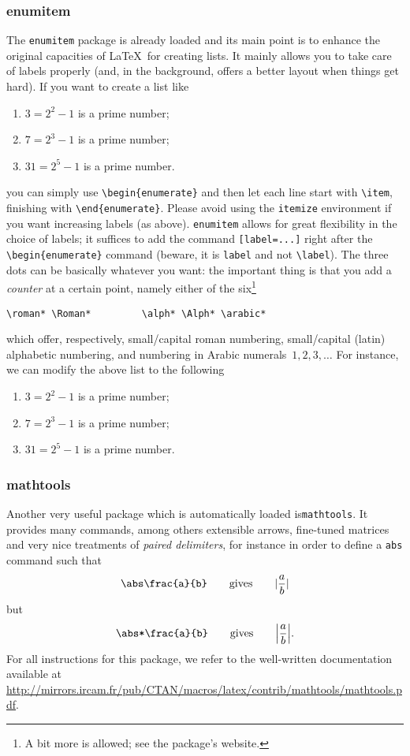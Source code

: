 \documentclass[IGT,Unicode]{cedram}
\DeclarePairedDelimiter\abs{\lvert}{\rvert} %
\begin{document}
\subsubsection{enumitem}\label{subsubsec:enumitem}
The \verb|enumitem| package is already loaded and its main point is to enhance the original capacities of
\LaTeX\ for creating lists. It mainly allows you to take care of labels properly (and, in the background,
offers a better layout when things get hard). If you want to create a list like
\begin{enumerate}
\item $3=2^2-1$ is a prime number;
\item $7=2^3-1$ is a prime number;
\item $31=2^5-1$ is a prime number.
\end{enumerate}
you can simply use \verb|\begin{enumerate}| and then let each line start with \verb|\item|, finishing with
\verb|\end{enumerate}|. Please avoid using the \verb|itemize| environment if you want increasing labels (as
above). \verb|enumitem| allows for great flexibility in the choice of labels; it suffices to add the command
\verb|[label=...]| right after the \verb|\begin{enumerate}| command (beware, it is \verb|label| and not
\verb|\label|). The three dots can be basically whatever you want: the important thing is that you add a
\emph{counter} at a certain point, namely either of the six\footnote{A bit more is allowed; see the package's
website.}
\begin{verbatim}
\roman*	\Roman*			\alph* \Alph* \arabic*
\end{verbatim}
which offer, respectively, small/capital roman numbering, small/capital (latin) alphabetic numbering, and
numbering in Arabic numerals~$1,2,3,\dotso$ For instance, we can modify the above list to the following
\begin{enumerate}[label=M\arabic*)]
\item $3=2^2-1$ is a prime number;
\item $7=2^3-1$ is a prime number;
\item $31=2^5-1$ is a prime number.
\end{enumerate}

\subsubsection{mathtools}
Another very useful package which is automatically loaded is\linebreak \verb|mathtools|. It provides many
commands, among others extensible arrows, fine-tuned matrices and very nice treatments of \emph{paired
delimiters}, for instance in order to define a \verb|abs| command such that
\[
\verb|\abs\frac{a}{b}|\qquad\text{gives}\qquad\abs{\frac{a}{b}}
\]
but
\[
\verb|\abs*\frac{a}{b}|\qquad\text{gives}\qquad\abs*{\frac{a}{b}}.
\]
For all instructions for this package,
we refer to the well-written documentation available at
\url{http://mirrors.ircam.fr/pub/CTAN/macros/latex/contrib/mathtools/mathtools.pdf}.
\end{document}
